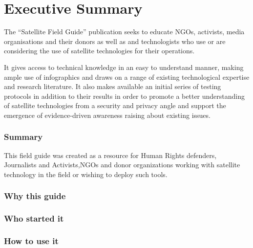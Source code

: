\part{Executive Summary}
\label{executivesummary}

The ``Satellite Field Guide'' publication seeks to educate NGOs, activists, media organisations and their donors as well as and technologists who use or are considering the use of satellite technologies for their operations.

It gives access to technical knowledge in an easy to understand manner, making ample use of infographics and draws on a range of existing technological expertise and research literature. It also makes available an initial series of testing protocols in addition to their results in order to promote a better understanding of satellite technologies from a security and privacy angle and support the emergence of evidence-driven awareness raising about existing issues.

\section{Summary}
\label{summary}

This field guide was created as a resource for Human Rights defenders, Journalists and Activists,NGOs and donor organizations working with satellite technology in the field or wishing to deploy such tools.

\section{Why this guide}
\label{whythisguide}

\section{Who started it}
\label{whostartedit}

\section{How to use it}
\label{howtouseit}
